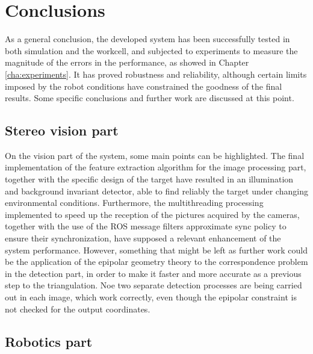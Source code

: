 
\chapter{Conclusions} %
\label{cha:conclusions}
As a general conclusion, the developed system has been successfully tested in both simulation and the workcell, and subjected to experiments to measure the magnitude of the errors in the performance, as showed in Chapter \ref{cha:experiments}.
It has proved robustness and reliability, although certain limits imposed by the robot conditions have constrained the goodness of the final results. Some specific conclusions and further work are discussed at this point.

\section{Stereo vision part}
On the vision part of the system, some main points can be highlighted.
The final implementation of the feature extraction algorithm for the image processing part, together with the specific design of the target have resulted in an illumination and background invariant detector, able to find reliably the target under changing environmental conditions.
Furthermore, the multithreading processing implemented to speed up the reception of the pictures acquired by the cameras, together with the use of the ROS message filters approximate sync policy to ensure their synchronization, have supposed a relevant enhancement of the system performance.
However, something that might be left as further work could be the application of the epipolar geometry theory to the correspondence problem in the detection part, in order to make it faster and more accurate as a previous step to the triangulation. 
Noe two separate detection processes are being carried out in each image, which work correctly, even though the epipolar constraint is not checked for the output coordinates.

\section{Robotics part}


